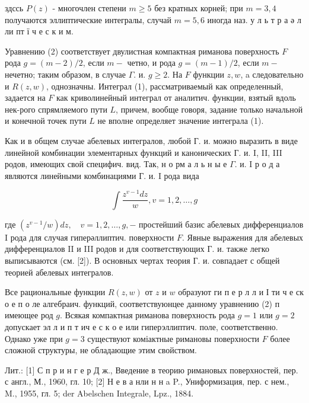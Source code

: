 \documentclass[10pt]{article}
\begin{document}
здссь $P(z)$ - многочлен степени $m \geqslant 5$ без кратных корней; при $m=3,4$ получаются эллиптические интегралы, случай $m=5,6$ иногда наз. у л ь т р а ә л ли пт ї ч е с к и м.



Уравнению (2) соответствует двулистная компактная риманова поверхность $F$ рода $g=(m-2) / 2$, если $m-$ четно, и рода $g=(m-1) / 2$, если $m-$ нечетно; таким образом, в случае $\Gamma$. и. $g \geqslant 2$. На $F$ функции $z, w$, a следовательно и $R(z, w)$, однозначны. Интеграл (1), рассматриваемый как определенный, задается на $F$ как криволинейный интеграл от аналитич. функции, взятый вдоль нек-рого спрямляемого пути $L$, причем, вообще говоря, задание только начальной и конечной точек пути $L$ не вполне определяет значение интеграла (1).



Как и в общем случае абелевых интегралов, любой Г. и. можно выразить в виде линейной комбинации элементарных функций и канонических Г. и. I, II, III родов, имеющих свой специфич. вид. Так, н о рм а л ь н ы е $\Gamma$. и. I р о д а являются линейными комбинациями Г. и. I рода вида



\[

\int \frac{z^{v-1} d z}{w}, v=1,2, \ldots, g

\]



где $\left(z^{v-1} / w\right) d z, \quad v=1,2, \ldots, g,-$ простейший базис абелевых дифференциалов I рода для случая гиперәллиптич. поверхности $F$. Явные выражения для абелевых дифференциалов II и III родов и для соответствующих Г. и. также легко выписываются (см. [2]). В основных чертах теория Г. и. совпадает с общей теорией абелевых интегралов.



Все рациональные функции $R(z, w)$ от $z$ и $w$ образуют ги п е р л л и І ти ч е ск о е п о ле алгебраич. функций, соответствуюнцее данному уравнению (2) п имеющее род $g$. Всякая компактная риманова поверхность рода $g=1$ или $g=2$ допускает эл л и п т ич е с к о е или гиперэллиптич. поле, соответственно. Однако уже при $g=3$ существуют коміактные римановы поверхности $F$ более сложной структуры, не обладающие этим свойством.



Лит.: [1] С п р и н г е р Д ж., Введение в теорию римановых поверхностей, пер. с англ., М., 1960, гл. 10; [2] Н е в а нли н н a P., Униформизация, пер. с нем., M., 1955, гл. 5; der Abelschen Integrale, Lpz., 1884.
\end{document}
